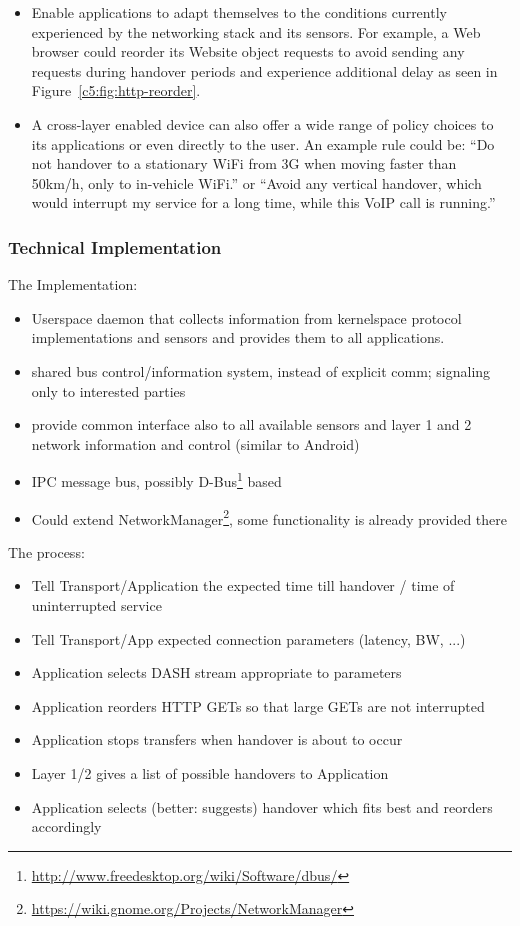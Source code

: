 \begin{itemize}
	\item Enable applications to adapt themselves to the conditions currently experienced by the networking stack and its sensors. For example, a Web browser could reorder its Website object requests to avoid sending any requests during handover periods and experience additional delay as seen in Figure~\ref{c5:fig:http-reorder}.

	\item A cross-layer enabled device can also offer a wide range of policy choices to its applications or even directly to the user. An example rule could be: ``Do not handover to a stationary WiFi from 3G when moving faster than 50km/h, only to in-vehicle WiFi.'' or ``Avoid any vertical handover, which would interrupt my service for a long time, while this VoIP call is running.''

\end{itemize}

\subsubsection{Technical Implementation}

The Implementation:
\begin{itemize}
	\item Userspace daemon that collects information from kernelspace protocol implementations and sensors and provides them to all applications.
	\item shared bus control/information system, instead of explicit comm; signaling only to interested parties
	\item provide common interface also to all available sensors and layer 1 and 2 network information and control (similar to Android)
	\item IPC message bus, possibly D-Bus\footnote{\url{http://www.freedesktop.org/wiki/Software/dbus/}} based
	\item Could extend NetworkManager\footnote{\url{https://wiki.gnome.org/Projects/NetworkManager}}, some functionality is already provided there

\end{itemize}

The process:
\begin{itemize}
\item Tell Transport/Application the expected time till handover / time of uninterrupted service
\item Tell Transport/App expected connection parameters (latency, BW, ...)
\item Application selects \gls{DASH} stream appropriate to parameters
\item Application reorders \gls{HTTP} GETs so that large GETs are not interrupted
\item Application stops transfers when handover is about to occur
\item Layer 1/2 gives a list of possible handovers to Application
\item Application selects (better: suggests) handover which fits best and reorders accordingly
\end{itemize}




